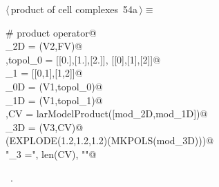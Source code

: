 \documentclass[11pt,oneside]{article}	%
\begin{document}
\begin{flushleft} \small \label{scrap91}
\protect{}$\langle\,$product of cell complexes\nobreak\ {\footnotesize 54a}$\,\rangle\equiv$
\vspace{-1ex}
\begin{list}{}{} \item
\mbox{}\verb@# product operator@\\
\mbox{}\verb@mod_2D = (V2,FV)@\\
\mbox{},topol_0 = [[0.],[1.],[2.]], [[0],[1],[2]]@\\
\mbox{}\verb@topol_1 = [[0,1],[1,2]]@\\
\mbox{}\verb@mod_0D = (V1,topol_0)@\\
\mbox{}\verb@mod_1D = (V1,topol_1)@\\
\mbox{},CV = larModelProduct([mod_2D,mod_1D])@\\
\mbox{}\verb@mod_3D = (V3,CV)@\\
\mbox{}\verb@VIEW(EXPLODE(1.2,1.2,1.2)(MKPOLS(mod_3D)))@\\
\mbox{}\verb@print "\nk_3 =", len(CV), "\n"@\\
\mbox{}\verb@@{\NWsep}
\end{list}
\vspace{-1ex}
\footnotesize\addtolength{\baselineskip}{-1ex}
\begin{list}{}{\setlength{\itemsep}{-\parsep}\setlength{\itemindent}{-\leftmargin}}
\item \NWtxtMacroRefIn\ .
\end{list}
\end{flushleft}
\end{document}
